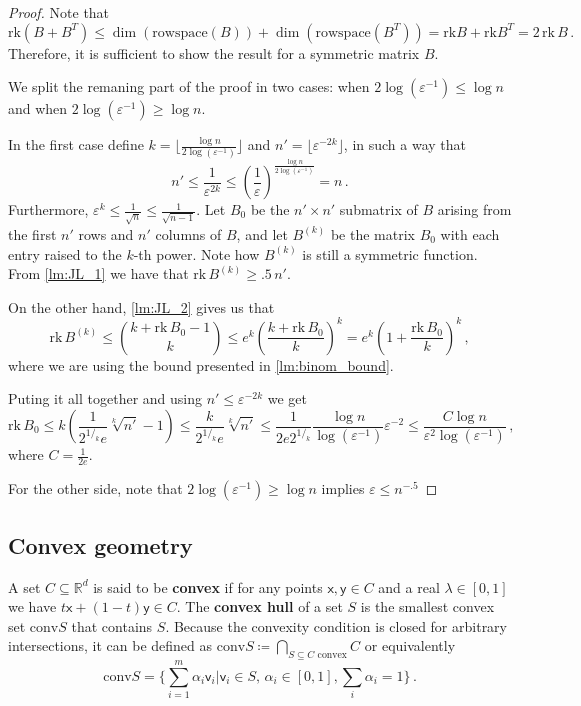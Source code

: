\documentclass[12pt]{amsart}
\theoremstyle{definition}
\newcommand{\R}{\mathbb{R}}
\newcommand{\vv}{\mathsf{v}}
\newcommand{\vx}{\mathsf{x}}
\newcommand{\vy}{\mathsf{y}}
\newcommand{\rk}{\mathrm{rk}}
\newcommand{\conv}{\mathrm{conv}}
\begin{document}
\begin{proof}
Note that 
$$\rk(B + B^T) \leq \dim( \mathrm{rowspace}(B) ) + \dim( \mathrm{rowspace}(B^T) ) =  \rk B + \rk B^T  = 2 \, \rk \, B\, . $$ 
Therefore, it is sufficient to show the result for a symmetric matrix $B$.

We split the remaning part of the proof in two cases: when $2 \log(\varepsilon^{-1}) \leq \log n$ and when $2 \log(\varepsilon^{-1}) \geq \log n$.

In the first case define $k = \lfloor \frac{\log n}{2 \log ( \varepsilon^{-1})} \rfloor$ and $n' = \lfloor \varepsilon^{-2k} \rfloor$, in such a way that 
$$ n' \leq \frac{1}{\varepsilon^{2k}} \leq \left( \frac{1}{\varepsilon} \right)^{\frac{\log n}{2 \log(\varepsilon^{-1})}} = n\, . $$
Furthermore, $\varepsilon^k \leq \frac{1}{\sqrt{n}} \leq \frac{1}{\sqrt{n-1}}$.
Let $B_0$ be the $n'\times n'$ submatrix of $B$ arising from the first $n'$ rows and $n'$ columns of $B$, and let $B^{(k)}$ be the matrix $B_0$ with each entry raised to the $k$-th power.
Note how $B^{(k)}$ is still a symmetric function.
From \cref{lm:JL_1} we have that $\rk \, B^{(k)} \geq .5 \, n'$.

On the other hand, \cref{lm:JL_2} gives us that 
$$\rk \, B^{(k)} \leq \binom{k + \rk\, B_0 - 1}{k} \leq e^k \left( \frac{k + \rk \, B_0}{k}\right)^k =  e^k \left(1 +  \frac{\rk \, B_0}{k}\right)^k\, , $$
where we are using the bound presented in \cref{lm:binom_bound}.

Puting it all together and using $n' \leq \varepsilon^{-2k}$ we get 
$$ \rk \, B_0 \leq k \left( \frac{1}{2^{1/_k} e} \sqrt[k]{n'} - 1\right)  \leq  \frac{k}{2^{1/_k} e} \sqrt[k]{n'} \leq \frac{1}{2e  2^{1/_k} }\frac{\log n}{\log(\varepsilon^{-1})}\varepsilon^{-2} \leq \frac{C \log n}{\varepsilon^2 \log(\varepsilon^{-1})}\, , $$
where $C = \frac{1}{2e}$.

For the other side, note that $2 \log(\varepsilon^{-1}) \geq \log n$ implies $\varepsilon \leq n^{-.5}$
\end{proof}


\subsection{Convex geometry}

A set $C \subseteq \R^d$ is said to be \textbf{convex} if for any points $\vx, \vy \in C$ and a real $\lambda \in [0, 1]$ we have $t\vx + (1-t)\vy \in C$.
The \textbf{convex hull} of a set $S$ is the smallest convex set $\conv S $ that contains $S$.
Because the convexity condition is closed for arbitrary intersections, it can be defined as $\conv S \coloneqq \bigcap_{S \subseteq C \text{ convex}} C$ or equivalently
$$ \conv S = \{ \sum_{i=1}^m \alpha_i\vv_i | \vv_i \in S, \, \alpha_i \in [0, 1], \sum_i \alpha_i = 1\} \, . $$
\end{document}
